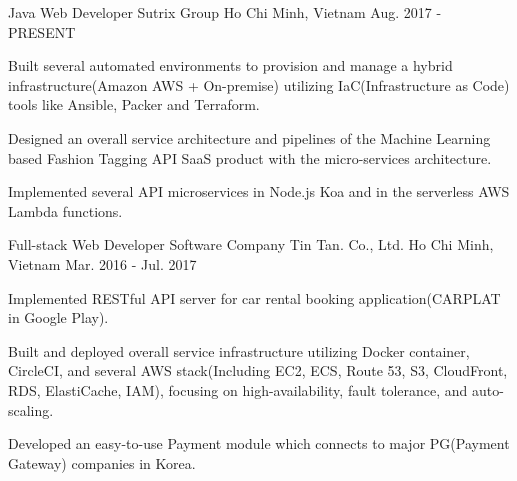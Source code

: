

\begin{cventries}

  \cventry
    {Java Web Developer} %
    {Sutrix Group} %
    {Ho Chi Minh, Vietnam} %
    {Aug. 2017 - PRESENT} %
    {
      \begin{cvitems} %
        \item {Built several automated environments to provision and manage a hybrid infrastructure(Amazon AWS + On-premise) utilizing IaC(Infrastructure as Code) tools like Ansible, Packer and Terraform.}
        \item {Designed an overall service architecture and pipelines of the Machine Learning based Fashion Tagging API SaaS product with the micro-services architecture.}
        \item {Implemented several API microservices in Node.js Koa and in the serverless AWS Lambda functions.}
      \end{cvitems}
    }

  \cventry
    {Full-stack Web Developer} %
    {Software Company Tin Tan. Co., Ltd.} %
    {Ho Chi Minh, Vietnam} %
    {Mar. 2016 - Jul. 2017} %
    {
      \begin{cvitems} %
        \item {Implemented RESTful API server for car rental booking application(CARPLAT in Google Play).}
        \item {Built and deployed overall service infrastructure utilizing Docker container, CircleCI, and several AWS stack(Including EC2, ECS, Route 53, S3, CloudFront, RDS, ElastiCache, IAM), focusing on high-availability, fault tolerance, and auto-scaling.}
        \item {Developed an easy-to-use Payment module which connects to major PG(Payment Gateway) companies in Korea.}
      \end{cvitems}
    }

\end{cventries}
